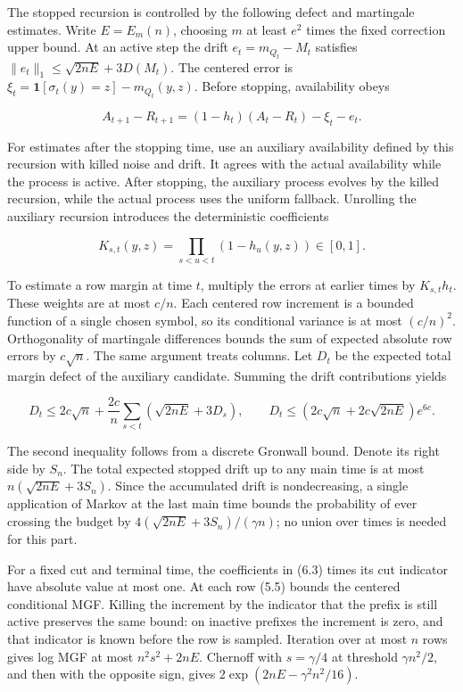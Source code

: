 \documentclass[english,11pt,a4paper]{article}
\begin{document}
The stopped recursion is controlled by the following defect and martingale estimates. Write \(E=E_m(n)\), choosing \(m\) at least \(e^2\) times the fixed correction upper bound. At an active step the drift \(e_t=m_{Q_t}-M_t\) satisfies \(\|e_t\|_1\le\sqrt{2nE}+3D(M_t)\). The centered error is \(\xi_t=\mathbf1[\sigma_t(y)=z]-m_{Q_t}(y,z)\). Before stopping, availability obeys

\nopagebreak[4]
\[A_{t+1}-R_{t+1}=(1-h_t)(A_t-R_t)-\xi_t-e_t.\tag{6.2}\]

For estimates after the stopping time, use an auxiliary availability defined by this recursion with killed noise and drift. It agrees with the actual availability while the process is active. After stopping, the auxiliary process evolves by the killed recursion, while the actual process uses the uniform fallback. Unrolling the auxiliary recursion introduces the deterministic coefficients

\nopagebreak[4]
\[K_{s,t}(y,z)=\prod_{s<u<t}(1-h_u(y,z))\in[0,1].\tag{6.3}\]

To estimate a row margin at time \(t\), multiply the errors at earlier times by \(K_{s,t}h_t\). These weights are at most \(c/n\). Each centered row increment is a bounded function of a single chosen symbol, so its conditional variance is at most \((c/n)^2\). Orthogonality of martingale differences bounds the sum of expected absolute row errors by \(c\sqrt n\). The same argument treats columns. Let \(D_t\) be the expected total margin defect of the auxiliary candidate. Summing the drift contributions yields

\nopagebreak[4]
\[D_t\le2c\sqrt n+\frac{2c}{n}\sum_{s<t}(\sqrt{2nE}+3D_s),\qquad
D_t\le(2c\sqrt n+2c\sqrt{2nE})e^{6c}.\tag{6.4}\]

The second inequality follows from a discrete Gronwall bound. Denote its right side by \(S_n\). The total expected stopped drift up to any main time is at most \(n(\sqrt{2nE}+3S_n)\). Since the accumulated drift is nondecreasing, a single application of Markov at the last main time bounds the probability of ever crossing the budget by \(4(\sqrt{2nE}+3S_n)/(\gamma n)\); no union over times is needed for this part.

For a fixed cut and terminal time, the coefficients in (6.3) times its cut indicator have absolute value at most one. At each row (5.5) bounds the centered conditional MGF. Killing the increment by the indicator that the prefix is still active preserves the same bound: on inactive prefixes the increment is zero, and that indicator is known before the row is sampled. Iteration over at most \(n\) rows gives log MGF at most \(n^2s^2+2nE\). Chernoff with \(s=\gamma/4\) at threshold \(\gamma n^2/2\), and then with the opposite sign, gives \(2\exp(2nE-\gamma^2n^2/16)\).
\end{document}
